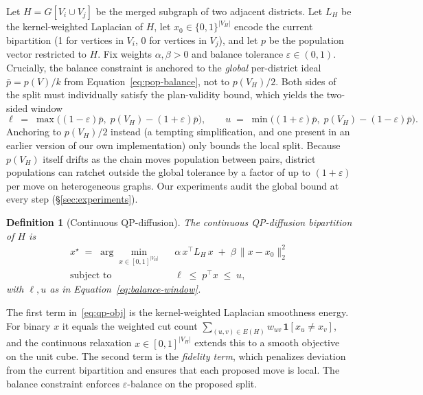 \documentclass[11pt]{article}
\newtheorem{definition}{Definition}[section]
\begin{document}
Let $H = G[V_i \cup V_j]$ be the merged subgraph of two adjacent
districts. Let $L_H$ be the kernel-weighted Laplacian of $H$, let
$x_0 \in \{0,1\}^{|V_H|}$ encode the current bipartition (1 for
vertices in $V_i$, 0 for vertices in $V_j$), and let $p$ be the
population vector restricted to $H$. Fix weights $\alpha, \beta > 0$
and balance tolerance $\varepsilon \in (0, 1)$. Crucially, the balance
constraint is anchored to the \emph{global} per-district ideal
$\bar p = p(V)/k$ from Equation~\eqref{eq:pop-balance}, not to
$p(V_H)/2$. Both sides of the split must individually satisfy the
plan-validity bound, which yields the two-sided window
\begin{equation}\label{eq:balance-window}
  \ell \;=\; \max\bigl((1-\varepsilon)\bar p,\; p(V_H) - (1+\varepsilon)\bar p\bigr),
  \qquad
  u \;=\; \min\bigl((1+\varepsilon)\bar p,\; p(V_H) - (1-\varepsilon)\bar p\bigr).
\end{equation}
Anchoring to $p(V_H)/2$ instead (a tempting simplification, and one
present in an earlier version of our own implementation) only bounds
the local split. Because $p(V_H)$ itself drifts as the chain moves
population between pairs, district populations can ratchet outside the
global tolerance by a factor of up to $(1+\varepsilon)$ per move on
heterogeneous graphs. Our experiments audit the global bound at every
step (\S\ref{sec:experiments}).

\begin{definition}[Continuous QP-diffusion]\label{def:qp}
The continuous QP-diffusion bipartition of $H$ is
\begin{align}
  x^\star \;=\; \arg\min_{x \in [0,1]^{|V_H|}} \;\;
    & \alpha\, x^\top L_H\, x \;+\; \beta\, \|x - x_0\|_2^2 \label{eq:qp-obj} \\
  \text{subject to} \;\;
    & \ell \;\le\; p^\top x \;\le\; u,
    \label{eq:qp-balance}
\end{align}
with $\ell, u$ as in Equation~\eqref{eq:balance-window}.
\end{definition}

The first term in~\eqref{eq:qp-obj} is the kernel-weighted Laplacian
smoothness energy. For binary $x$ it equals the weighted cut count
$\sum_{(u,v) \in E(H)} w_{uv}\,\mathbf{1}[x_u \ne x_v]$, and the
continuous relaxation $x \in [0,1]^{|V_H|}$ extends this to a smooth
objective on the unit cube. The second term is the \emph{fidelity term},
which penalizes deviation from the current bipartition and ensures
that each proposed move is local. The balance constraint enforces
$\varepsilon$-balance on the proposed split.
\end{document}
